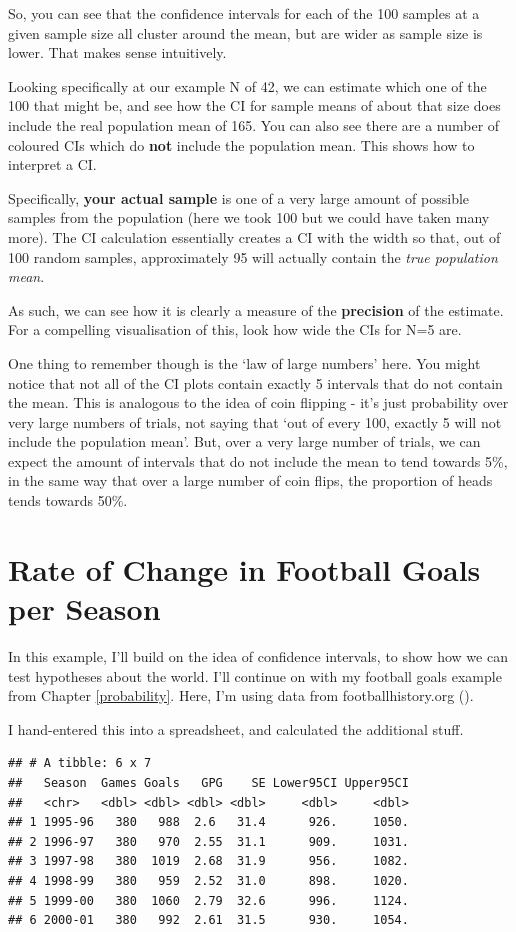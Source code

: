 \documentclass[
]{book}
\begin{document}
So, you can see that the confidence intervals for each of the 100 samples at a given sample size all cluster around the mean, but are wider as sample size is lower. That makes sense intuitively.

Looking specifically at our example N of 42, we can estimate which one of the 100 that might be, and see how the CI for sample means of about that size does include the real population mean of 165. You can also see there are a number of coloured CIs which do \textbf{not} include the population mean. This shows how to interpret a CI.

Specifically, \textbf{your actual sample} is one of a very large amount of possible samples from the population (here we took 100 but we could have taken many more). The CI calculation essentially creates a CI with the width so that, out of 100 random samples, approximately 95 will actually contain the \emph{true population mean}.

As such, we can see how it is clearly a measure of the \textbf{precision} of the estimate. For a compelling visualisation of this, look how wide the CIs for N=5 are.

One thing to remember though is the `law of large numbers' here. You might notice that not all of the CI plots contain exactly 5 intervals that do not contain the mean. This is analogous to the idea of coin flipping - it's just probability over very large numbers of trials, not saying that `out of every 100, exactly 5 will not include the population mean'. But, over a very large number of trials, we can expect the amount of intervals that do not include the mean to tend towards 5\%, in the same way that over a large number of coin flips, the proportion of heads tends towards 50\%.

\section{Rate of Change in Football Goals per Season}\label{rate-of-change-in-football-goals-per-season}

In this example, I'll build on the idea of confidence intervals, to show how we can test hypotheses about the world. I'll continue on with my football goals example from Chapter \ref{probability}. Here, I'm using data from footballhistory.org ().

I hand-entered this into a spreadsheet, and calculated the additional stuff.

\begin{verbatim}
## # A tibble: 6 x 7
##   Season  Games Goals   GPG    SE Lower95CI Upper95CI
##   <chr>   <dbl> <dbl> <dbl> <dbl>     <dbl>     <dbl>
## 1 1995-96   380   988  2.6   31.4      926.     1050.
## 2 1996-97   380   970  2.55  31.1      909.     1031.
## 3 1997-98   380  1019  2.68  31.9      956.     1082.
## 4 1998-99   380   959  2.52  31.0      898.     1020.
## 5 1999-00   380  1060  2.79  32.6      996.     1124.
## 6 2000-01   380   992  2.61  31.5      930.     1054.
\end{verbatim}
\end{document}
